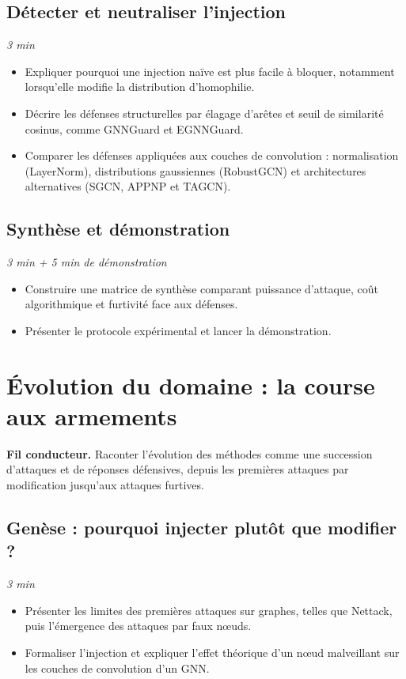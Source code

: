 \documentclass[11pt,a4paper]{article}
\newcommand{\duree}[1]{\hfill\textit{#1}}
\begin{document}
\subsection{Détecter et neutraliser l'injection}\duree{3 min}
\begin{itemize}
    \item Expliquer pourquoi une injection naïve est plus facile à bloquer,
    notamment lorsqu'elle modifie la distribution d'homophilie.
    \item Décrire les défenses structurelles par élagage d'arêtes et seuil de
    similarité cosinus, comme GNNGuard et EGNNGuard.
    \item Comparer les défenses appliquées aux couches de convolution :
    normalisation (LayerNorm), distributions gaussiennes (RobustGCN) et
    architectures alternatives (SGCN, APPNP et TAGCN).
\end{itemize}

\subsection{Synthèse et démonstration}\duree{3 min + 5 min de démonstration}
\begin{itemize}
    \item Construire une matrice de synthèse comparant puissance d'attaque,
    coût algorithmique et furtivité face aux défenses.
    \item Présenter le protocole expérimental et lancer la démonstration.
\end{itemize}

\section{Évolution du domaine : la course aux armements}

\textbf{Fil conducteur.} Raconter l'évolution des méthodes comme une succession
d'attaques et de réponses défensives, depuis les premières attaques par
modification jusqu'aux attaques furtives.

\subsection{Genèse : pourquoi injecter plutôt que modifier ?}\duree{3 min}
\begin{itemize}
    \item Présenter les limites des premières attaques sur graphes, telles que
    Nettack, puis l'émergence des attaques par faux nœuds.
    \item Formaliser l'injection et expliquer l'effet théorique d'un nœud
    malveillant sur les couches de convolution d'un GNN.
\end{itemize}
\end{document}
